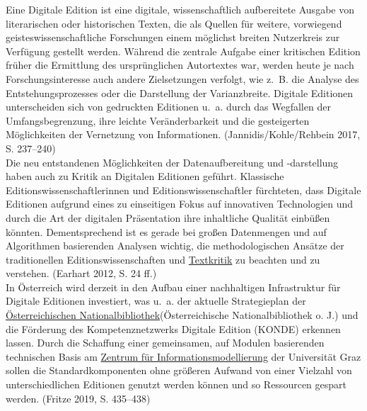 \documentclass{article}
\begin{document}
    Eine Digitale Edition ist eine digitale, wissenschaftlich aufbereitete Ausgabe von literarischen oder historischen Texten, die als Quellen für weitere, vorwiegend geisteswissenschaftliche Forschungen einem möglichst breiten Nutzerkreis zur Verfügung gestellt werden. Während die zentrale Aufgabe einer kritischen Edition früher die Ermittlung des ursprünglichen Autortextes war, werden heute je nach Forschungsinteresse auch andere Zielsetzungen verfolgt, wie z. B. die Analyse des Entstehungsprozesses oder die Darstellung der Varianzbreite. Digitale Editionen unterscheiden sich von gedruckten Editionen u. a. durch das Wegfallen der Umfangsbegrenzung, ihre leichte Veränderbarkeit und die gesteigerten Möglichkeiten der Vernetzung von Informationen. (Jannidis/Kohle/Rehbein 2017, S. 237–240)\\
            
        Die neu entstandenen Möglichkeiten der Datenaufbereitung und -darstellung haben auch zu Kritik an Digitalen Editionen geführt. Klassische Editionswissenschaftlerinnen und Editionswissenschaftler fürchteten, dass Digitale Editionen aufgrund eines zu einseitigen Fokus auf innovativen Technologien und durch die Art der digitalen Präsentation ihre inhaltliche Qualität einbüßen könnten. Dementsprechend ist es gerade bei großen Datenmengen und auf Algorithmen basierenden Analysen wichtig, die methodologischen Ansätze der traditionellen Editionswissenschaften und \href{http://gams.uni-graz.at/o:konde.192}{Textkritik} zu beachten und zu verstehen. (Earhart 2012, S. 24 ff.)\\
            
        In Österreich wird derzeit in den Aufbau einer nachhaltigen Infrastruktur für Digitale Editionen investiert, was u. a. der aktuelle Strategieplan der \href{http://gams.uni-graz.at/o:konde.153}{Österreichischen Nationalbibliothek}(Österreichische Nationalbibliothek o. J.) und die Förderung des Kompetenznetzwerks Digitale Edition (KONDE) erkennen lassen. Durch die Schaffung einer gemeinsamen, auf Modulen basierenden technischen Basis am \href{http://gams.uni-graz.at/o:konde.217}{Zentrum für Informationsmodellierung} der Universität Graz sollen die Standardkomponenten ohne größeren Aufwand von einer Vielzahl von unterschiedlichen Editionen genutzt werden können und so Ressourcen gespart werden.  (Fritze 2019, S. 435–438)\\
            
\end{document}
